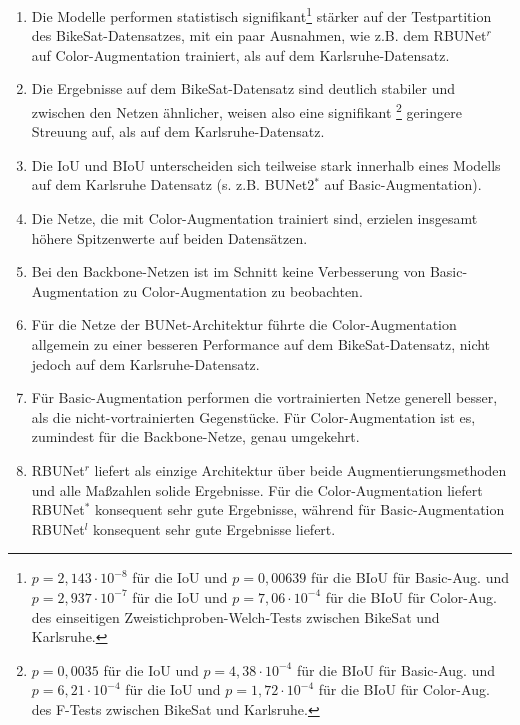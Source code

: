 \begin{enumerate}
	\item Die Modelle performen statistisch signifikant\footnote{
		$p = 2,143\cdot 10^{-8}$ für die IoU und $p = 0,00639$ für die BIoU für Basic-Aug. und 
		$p = 2,937\cdot 10^{-7}$ für die IoU und $p = 7,06 \cdot 10^{-4}$ für die BIoU für Color-Aug.
		des einseitigen Zweistichproben-Welch-Tests zwischen BikeSat und Karlsruhe. 
	} stärker auf der Testpartition des BikeSat-Datensatzes, mit ein paar Ausnahmen, wie z.B. dem RBUNet$^r$ auf Color-Augmentation trainiert, 
	als auf dem Karlsruhe-Datensatz. 
	\item Die Ergebnisse auf dem BikeSat-Datensatz sind deutlich stabiler und zwischen den Netzen ähnlicher, weisen also eine signifikant \footnote{
		$p = 0,0035$ für die IoU und $p = 4,38\cdot 10^{-4}$ für die BIoU für Basic-Aug. und 
		$p = 6,21\cdot 10^{-4}$ für die IoU und $p = 1,72 \cdot 10^{-4}$ für die BIoU für Color-Aug.
		des F-Tests zwischen BikeSat und Karlsruhe. 
	} geringere Streuung auf, als auf dem Karlsruhe-Datensatz.
	\item Die \ac{IoU} und \ac{BIoU} unterscheiden sich teilweise stark innerhalb eines Modells auf dem Karlsruhe Datensatz (s. z.B. BUNet2$^*$ auf Basic-Augmentation).
	\item Die Netze, die mit Color-Augmentation trainiert sind, erzielen insgesamt höhere Spitzenwerte auf beiden Datensätzen. 
	\item Bei den Backbone-Netzen ist im Schnitt keine Verbesserung von Basic-Augmentation zu Color-Augmentation zu beobachten. 
	\item Für die Netze der BUNet-Architektur führte die Color-Augmentation allgemein zu einer besseren Performance auf dem BikeSat-Datensatz, nicht jedoch auf dem Karlsruhe-Datensatz.
	\item Für Basic-Augmentation performen die vortrainierten Netze generell besser, als die nicht-vortrainierten Gegenstücke. 
	Für Color-Augmentation ist es, zumindest für die Backbone-Netze, genau umgekehrt. 
	\item RBUNet$^r$ liefert als einzige Architektur über beide Augmentierungsmethoden und alle Maßzahlen solide Ergebnisse. 
	Für die Color-Augmentation liefert RBUNet$^*$ konsequent sehr gute Ergebnisse, während für Basic-Augmentation RBUNet$^l$ konsequent sehr gute Ergebnisse liefert.
\end{enumerate}



